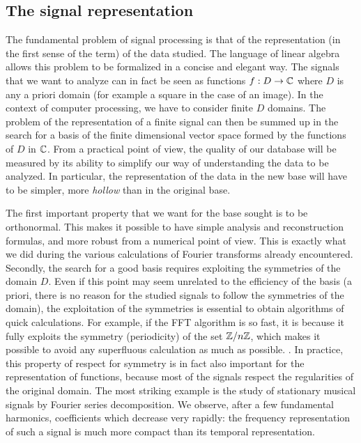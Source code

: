 \subsection{The signal representation}
 
 
 The fundamental problem of signal processing is that of the representation (in the first sense of the term) of the data studied. The language of linear algebra allows this problem to be formalized in a concise and elegant way. The signals that we want to analyze can in fact be seen as functions $ f: D \rightarrow \mathbb{C} $ where $ D $ is any a priori domain (for example a square in the case of an image). In the context of computer processing, we have to consider finite $ D $ domains. The problem of the representation of a finite signal can then be summed up in the search for a  basis of the finite dimensional vector space formed by the functions of $ D $ in $ \mathbb{C} $. From a practical point of view, the quality of our database will be measured by its ability to simplify our way of understanding the data to be analyzed. In particular, the representation of the data in the new base will have to be simpler, more \textit{hollow} than in the original base.
 
 
 The first important property that we want for the base sought is to be orthonormal. This makes it possible to have simple analysis and reconstruction formulas, and more robust from a numerical point of view. This is exactly what we did during the various calculations of Fourier transforms already encountered. Secondly, the search for a good basis requires exploiting the symmetries of the domain $ D $. Even if this point may seem unrelated to the efficiency of the basis (a priori, there is no reason for the studied signals to follow the symmetries of the domain), the exploitation of the symmetries is essential to obtain algorithms of quick calculations. For example, if the FFT algorithm is so fast, it is because it fully exploits the symmetry (periodicity) of the set $ \mathbb{Z}/n \mathbb{Z} $, which makes it possible to avoid any superfluous calculation as much as possible. . In practice, this property of respect for symmetry is in fact also important for the representation of functions, because most of the  signals respect the regularities of the original domain. The most striking example is the study of stationary musical signals by Fourier series decomposition. We observe, after a few fundamental harmonics, coefficients which decrease very rapidly: the frequency representation of such a signal is much more compact than its temporal representation.
 

